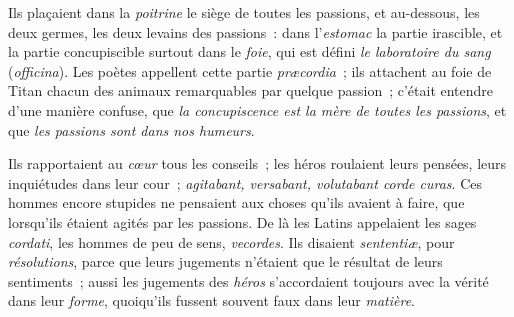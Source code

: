 \documentclass[french,twoside]{book} %
\begin{document}
Ils plaçaient dans la {\itshape poitrine} le siège de toutes les passions, et au-dessous, les deux germes, les deux levains des passions : dans l’{\itshape estomac} la partie irascible, et la partie concupiscible surtout dans le {\itshape foie}, qui est défini {\itshape le laboratoire du sang} ({\itshape officina}). Les poètes appellent cette partie {\itshape præcordia} ; ils attachent au foie de Titan chacun des animaux remarquables par quelque passion ; c’était entendre d’une manière confuse, que {\itshape la concupiscence est la mère de toutes les passions}, et que {\itshape les passions sont dans nos humeurs}.\par
Ils rapportaient au {\itshape cœur} tous les conseils ; les héros roulaient leurs pensées, leurs inquiétudes dans leur cour ; {\itshape agitabant, versabant, volutabant corde curas}. Ces hommes encore stupides ne pensaient aux choses qu’ils avaient à faire, que lorsqu’ils étaient agités par les passions. De là les Latins appelaient les sages {\itshape cordati}, les hommes de peu de sens, {\itshape vecordes}. Ils disaient {\itshape sententiæ}, pour {\itshape résolutions}, parce que leurs jugements n’étaient que le résultat de leurs sentiments ; aussi les jugements des {\itshape héros} s’accordaient toujours avec la vérité dans leur {\itshape forme}, quoiqu’ils fussent souvent faux dans leur {\itshape matière}.
\end{document}
